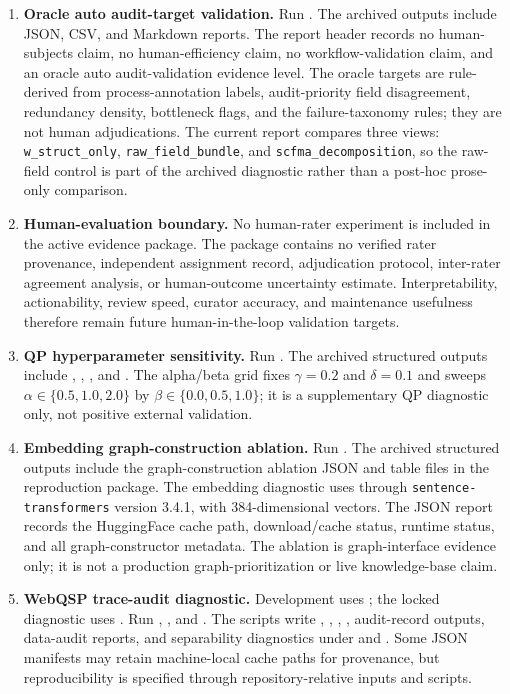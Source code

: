 \documentclass[a4paper,fleqn]{cas-sc}
\begin{document}
\begin{enumerate}
\item \textbf{Oracle auto audit-target validation.} Run . The archived outputs include JSON, CSV, and Markdown reports. The report header records no human-subjects claim, no human-efficiency claim, no workflow-validation claim, and an oracle auto audit-validation evidence level. The oracle targets are rule-derived from process-annotation labels, audit-priority field disagreement, redundancy density, bottleneck flags, and the failure-taxonomy rules; they are not human adjudications. The current report compares three views: \texttt{w\_struct\_only}, \texttt{raw\_field\_bundle}, and \texttt{scfma\_decomposition}, so the raw-field control is part of the archived diagnostic rather than a post-hoc prose-only comparison.
\item \textbf{Human-evaluation boundary.} No human-rater experiment is included in the active evidence package. The package contains no verified rater provenance, independent assignment record, adjudication protocol, inter-rater agreement analysis, or human-outcome uncertainty estimate. Interpretability, actionability, review speed, curator accuracy, and maintenance usefulness therefore remain future human-in-the-loop validation targets.
\item \textbf{QP hyperparameter sensitivity.} Run . The archived structured outputs include , , , and . The alpha/beta grid fixes $\gamma=0.2$ and $\delta=0.1$ and sweeps $\alpha \in \{0.5,1.0,2.0\}$ by $\beta \in \{0.0,0.5,1.0\}$; it is a supplementary QP diagnostic only, not positive external validation.
\item \textbf{Embedding graph-construction ablation.} Run . The archived structured outputs include the graph-construction ablation JSON and table files in the reproduction package. The embedding diagnostic uses  through \texttt{sentence-transformers} version 3.4.1, with 384-dimensional vectors. The JSON report records the HuggingFace cache path, download/cache status, runtime status, and all graph-constructor metadata. The ablation is graph-interface evidence only; it is not a production graph-prioritization or live knowledge-base claim.
\item \textbf{WebQSP trace-audit diagnostic.} Development uses ; the locked diagnostic uses . Run , , and . The scripts write , , , , audit-record outputs, data-audit reports, and separability diagnostics under  and . Some JSON manifests may retain machine-local cache paths for provenance, but reproducibility is specified through repository-relative inputs and scripts.

\end{enumerate}
\end{document}
